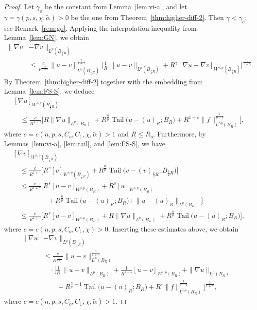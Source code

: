 \documentclass[10pt,letterpaper]{amsart}
\theoremstyle{definition}
\numberwithin{theorem}{section}
\numberwithin{equation}{section}
\newcommand{\1}{\ensuremath{\mathds{1}}}
\renewcommand{\epsilon}{\varepsilon}
\renewcommand{\epsilon}{\varepsilon}
\DeclareMathOperator{\Tail}{Tail}
\numberwithin{equation}{section}
\begin{document}
\begin{proof}
Let $\gamma_o$ be the constant from Lemma~\ref{lem:vi-a}, and let 
$\gamma = \gamma(p,s,\chi,\tilde{\alpha})>0$ be the one from Theorem~\ref{thm:higher-diff-2}. 
Then $\gamma < \gamma_o$; see Remark~\ref{rem:go}.  
Applying the interpolation inequality from Lemma~\ref{lem:GN}, we obtain
\begin{align*}
    \|\nabla u &- \nabla v\|_{L^p(B_{\frac14 R})} \\
    &\leq 
    \frac{c}{R^{\frac{\gamma}{1+\gamma}}}
    \|u-v\|_{L^p(B_{{\frac14R}})}^{\frac{\gamma}{1+\gamma}} 
    \bigg[ 
    \frac{1}{R}\,\|u-v\|_{L^p(B_{{\frac14R}})}
    + 
    R^\gamma [\nabla u-\nabla v]_{W^{\gamma,p}(B_{{\frac14R}})}\bigg]^{\frac{1}{1+\gamma}}.
\end{align*}
By Theorem~\ref{thm:higher-diff-2} together with the embedding from Lemma~\ref{lem:FS-S}, we deduce
\begin{align*}
    & [\nabla u]_{W^{\gamma,p}(B_{{\frac14R}})}\\
    &\quad\leq 
    \frac{c}{R^{1+\gamma}} \Big[ R \| \nabla u \|_{L^{p}(B_{R})} +  R^\frac{n}{p} \Tail \big(u-(u)_{R}; B_{R}\big) + R^{1+\epsilon} \| f \|_{L^{\tilde \alpha p}(B_{R})}^\frac{1}{p-1} \Big],
\end{align*}
where $c=c(n,p,s,C_o,C_1,\chi,\tilde\alpha)>1$ and $R \leq R_o$. Furthermore, by Lemmas~\ref{lem:vi-a}, \ref{lem:tail}, and \ref{lem:FS-S}, we have
\begin{align*}
    &[\nabla v]_{W^{\gamma,p}(B_{\frac14 R})} \\
    &\quad\leq
    \frac{c}{R^{1+\gamma}} \Big[ R^{s}[v]_{W^{s,p}(B_{{\frac12R}})} +
    R^\frac{n}{p} \Tail\big(v-(v)_{{\frac12R}};B_{{\frac12R}}\big)\Big] \\
    &\quad\leq
    \frac{c}{R^{1+\gamma}} \Big[ 
    R^{s}[u-v]_{W^{s,p}(B_{R})} +
    R^{s}[u]_{W^{s,p}(B_{R})} \\
    &\qquad\qquad\quad + 
    R^\frac{n}{p} \Tail\big(u-(u)_{R};B_{R}\big) +
    \|u-(u)_R\|_{L^p(B_R)} \Big] \\
    &\quad \leq 
    \frac{c}{R^{1+\gamma}}\Big[ 
    R^s[u-v]_{W^{s,p}(B_{R})} +
    R\|\nabla u\|_{L^p(B_R)} +
    R^{\frac{n}{p}} \Tail \big(u-(u)_{R}; B_R\big)\Big],
\end{align*}
where
$c=c(n,p,s,C_o,C_1,\chi)>0$.
Inserting these estimates above, we obtain 
\begin{align}\label{grad-comp-1}\nonumber
    \|\nabla u &- \nabla v\|_{L^p(B_{\frac14 R})} \\
    &\leq 
    \frac{c}{R^{\frac{\gamma}{1+\gamma}}}
    \|u-v\|_{L^p(B_{R})}^{\frac{\gamma}{1+\gamma}} \nonumber\\
    &\quad \cdot
    \bigg[ 
    \frac{1}{R}\,\|u-v\|_{L^p(B_{R})} +
    \frac{1}{R^{1-s}}[u-v]_{W^{s,p}(B_{R})} + 
    \| \nabla u \|_{L^{p}(B_R)} \nonumber\\
    &\qquad +  
    R^{\frac{n}{p}-1} \Tail \big(u-(u)_{R}; B_R\big) + 
    R^{\epsilon} \| f \|_{L^{\tilde \alpha p}(B_R)}^\frac{1}{p-1}\bigg]^{\frac{1}{1+\gamma}}  ,
\end{align}
where $c=c(n,p,s,C_o,C_1,\chi,\tilde\alpha)>1$. 


\end{proof}
\end{document}
